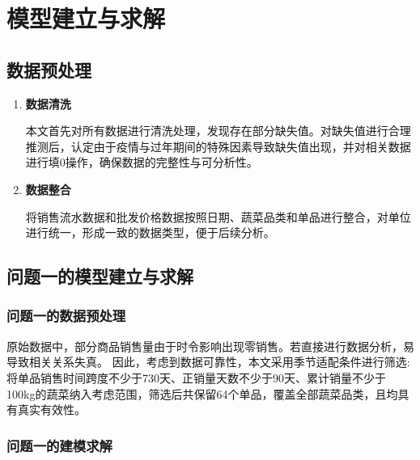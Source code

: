 \documentclass[withoutpreface,bwprint]{cumcmthesis} %
\numberwithin{equation}{section}
\begin{document}
\section{模型建立与求解}
    \subsection{\textbf{数据预处理}}


    \begin{enumerate}[leftmargin=2em]
        \item \textbf{数据清洗}  
        
        \hspace*{2em} 本文首先对所有数据进行清洗处理，发现存在部分缺失值。对缺失值进行合理推测后，认定由于疫情与过年期间的特殊因素导致缺失值出现，并对相关数据进行填0操作，确保数据的完整性与可分析性。

        \item \textbf{数据整合}
        
        \hspace*{2em} 将销售流水数据和批发价格数据按照日期、蔬菜品类和单品进行整合，对单位进行统一，形成一致的数据类型，便于后续分析。
      
    \end{enumerate}
\subsection{问题一的模型建立与求解}
\subsubsection{问题一的数据预处理}
原始数据中，部分商品销售量由于时令影响出现零销售。若直接进行数据分析，易导致相关关系失真。
因此，考虑到数据可靠性，本文采用季节适配条件进行筛选:将单品销售时间跨度不少于730天、正销量天数不少于90天、累计销量不少于100kg的蔬菜纳入考虑范围，筛选后共保留64个单品，覆盖全部蔬菜品类，且均具有真实有效性。
\subsubsection{问题一的建模求解}
\end{document}
